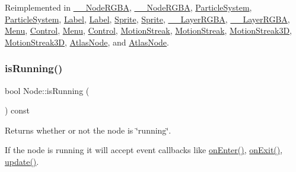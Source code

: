Reimplemented in \hyperlink{class____NodeRGBA_a60d28606b0a253ad511df43a868fa08c}{\+\_\+\+\_\+\+Node\+R\+G\+BA}, \hyperlink{class____NodeRGBA_a60d28606b0a253ad511df43a868fa08c}{\+\_\+\+\_\+\+Node\+R\+G\+BA}, \hyperlink{classParticleSystem_a36df0682b59803de36c914ce2bffe47d}{Particle\+System}, \hyperlink{classParticleSystem_a36df0682b59803de36c914ce2bffe47d}{Particle\+System}, \hyperlink{classLabel_ade8bf273e99add4d4861697d469f6d89}{Label}, \hyperlink{classLabel_ade8bf273e99add4d4861697d469f6d89}{Label}, \hyperlink{classSprite_af25cfe5f1f6178f5a13db86a258848d0}{Sprite}, \hyperlink{classSprite_a00d162b3e55fc5acd56e5c3e48bc0a97}{Sprite}, \hyperlink{class____LayerRGBA_a014dba2472f2708ad4493e97ca5999b0}{\+\_\+\+\_\+\+Layer\+R\+G\+BA}, \hyperlink{class____LayerRGBA_a014dba2472f2708ad4493e97ca5999b0}{\+\_\+\+\_\+\+Layer\+R\+G\+BA}, \hyperlink{classMenu_a94211ecf8dd3edeed2e5d54f63ae90b9}{Menu}, \hyperlink{classControl_ac49bc0859aade4ad1ab6311941b4207a}{Control}, \hyperlink{classMenu_ae173fda432df51ec761c8ef5d96ea59a}{Menu}, \hyperlink{classControl_af7a191cace0c56d1dae182716c0e8150}{Control}, \hyperlink{classMotionStreak_a74c2b98555067ccd7d069273f9569aba}{Motion\+Streak}, \hyperlink{classMotionStreak_a9cadee9d318c3bbc1e299563e0ce8d97}{Motion\+Streak}, \hyperlink{classMotionStreak3D_a5de4e2e686f06acfecf86fc7b7caed6e}{Motion\+Streak3D}, \hyperlink{classMotionStreak3D_a6b513fcdb7b462e2a28bb67e3dd35836}{Motion\+Streak3D}, \hyperlink{classAtlasNode_ad7d0c0a791719739d15e4f07c75f6704}{Atlas\+Node}, and \hyperlink{classAtlasNode_a3aa161e8abaff7422b7f9ef895f9439d}{Atlas\+Node}.

\mbox{\label{classNode_aebd879ffa85ad31896051073e1d7a6d8}} 
\subsubsection{\texorpdfstring{is\+Running()}{isRunning()}\hspace{0.1cm}{\footnotesize\ttfamily [1/2]}}
{\footnotesize\ttfamily bool Node\+::is\+Running (\begin{DoxyParamCaption}{ }\end{DoxyParamCaption}) const\hspace{0.3cm}{\ttfamily [virtual]}}

Returns whether or not the node is \char`\"{}running\char`\"{}.

If the node is running it will accept event callbacks like \hyperlink{classNode_a7f51764c4afd5018a052b9ef71c03374}{on\+Enter()}, \hyperlink{classNode_ac83de835ea315e3179d4293acd8903ac}{on\+Exit()}, \hyperlink{classNode_a32878481ba54b3856ab53c10af13848e}{update()}.

